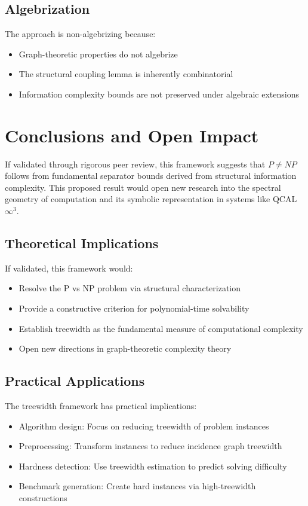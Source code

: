 \documentclass[11pt]{article}
\begin{document}
\subsection{Algebrization}

The approach is non-algebrizing because:
\begin{itemize}
\item Graph-theoretic properties do not algebrize
\item The structural coupling lemma is inherently combinatorial
\item Information complexity bounds are not preserved under algebraic extensions
\end{itemize}

\section{Conclusions and Open Impact}

If validated through rigorous peer review, this framework suggests that $P \neq NP$ follows from fundamental separator bounds derived from structural information complexity. This proposed result would open new research into the spectral geometry of computation and its symbolic representation in systems like QCAL $\infty^3$.

\subsection{Theoretical Implications}

If validated, this framework would:
\begin{itemize}
\item Resolve the P vs NP problem via structural characterization
\item Provide a constructive criterion for polynomial-time solvability
\item Establish treewidth as the fundamental measure of computational complexity
\item Open new directions in graph-theoretic complexity theory
\end{itemize}

\subsection{Practical Applications}

The treewidth framework has practical implications:
\begin{itemize}
\item Algorithm design: Focus on reducing treewidth of problem instances
\item Preprocessing: Transform instances to reduce incidence graph treewidth
\item Hardness detection: Use treewidth estimation to predict solving difficulty
\item Benchmark generation: Create hard instances via high-treewidth constructions
\end{itemize}
\end{document}
